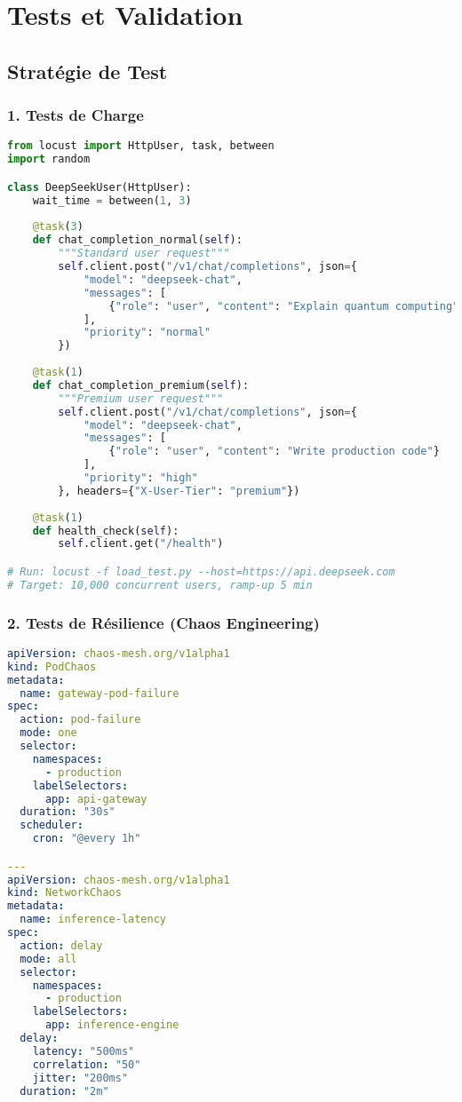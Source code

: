 \documentclass[12pt,a4paper]{article}
\begin{document}
\newpage
\section{Tests et Validation}

\subsection{Stratégie de Test}

\subsubsection{1. Tests de Charge}

\begin{lstlisting}[language=python, caption=Script de Load Testing (Locust)]
from locust import HttpUser, task, between
import random

class DeepSeekUser(HttpUser):
    wait_time = between(1, 3)
    
    @task(3)
    def chat_completion_normal(self):
        """Standard user request"""
        self.client.post("/v1/chat/completions", json={
            "model": "deepseek-chat",
            "messages": [
                {"role": "user", "content": "Explain quantum computing"}
            ],
            "priority": "normal"
        })
    
    @task(1)
    def chat_completion_premium(self):
        """Premium user request"""
        self.client.post("/v1/chat/completions", json={
            "model": "deepseek-chat",
            "messages": [
                {"role": "user", "content": "Write production code"}
            ],
            "priority": "high"
        }, headers={"X-User-Tier": "premium"})
    
    @task(1)
    def health_check(self):
        self.client.get("/health")

# Run: locust -f load_test.py --host=https://api.deepseek.com
# Target: 10,000 concurrent users, ramp-up 5 min
\end{lstlisting}

\subsubsection{2. Tests de Résilience (Chaos Engineering)}

\begin{lstlisting}[language=yaml, caption=Chaos Mesh Experiment]
apiVersion: chaos-mesh.org/v1alpha1
kind: PodChaos
metadata:
  name: gateway-pod-failure
spec:
  action: pod-failure
  mode: one
  selector:
    namespaces:
      - production
    labelSelectors:
      app: api-gateway
  duration: "30s"
  scheduler:
    cron: "@every 1h"

---
apiVersion: chaos-mesh.org/v1alpha1
kind: NetworkChaos
metadata:
  name: inference-latency
spec:
  action: delay
  mode: all
  selector:
    namespaces:
      - production
    labelSelectors:
      app: inference-engine
  delay:
    latency: "500ms"
    correlation: "50"
    jitter: "200ms"
  duration: "2m"
\end{lstlisting}
\end{document}
